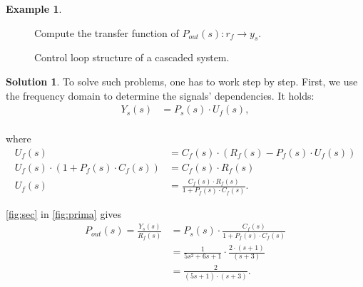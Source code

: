 \documentclass[a4paper,12 pt]{article}
\numberwithin{equation}{section}
\theoremstyle{definition}
\newtheorem{bsp}{Example}
\theoremstyle{remark}
\theoremstyle{definition}
\newtheorem*{lsg}{Solution}
\theoremstyle{definition}
\theoremstyle{definition}
\theoremstyle{remark}
\begin{document}
\begin{bsp}
\begin{figure}[h]
\begin{center}
\caption{Control loop structure of a cascaded system.}
\label{fig:casc3}
\end{center}
Compute the transfer function of $P_{out}(s):r_f\rightarrow y_s$.
\end{figure}



\newpage
\begin{lsg}
To solve such problems, one has to work step by step. First, we use the frequency domain to determine the signals' dependencies. It holds:
\begin{equation}
\begin{split}
Y_s(s)&=P_s(s)\cdot U_f(s),\\
\end{split}
\label{fig:prima}
\end{equation}

where
\begin{equation}
\begin{split}
U_f(s)&=C_f(s)\cdot \left( R_f(s)-P_f(s)\cdot U_f(s)\right)\\
U_f(s)\cdot \left( 1+P_f(s)\cdot C_f(s)\right)&=C_f(s)\cdot R_f(s)\\
U_f(s)&=\frac{C_f(s)\cdot R_f(s)}{1+P_f(s)\cdot C_f(s)}.
\end{split}
\label{fig:sec}
\end{equation}

\ref{fig:sec} in \ref{fig:prima} gives
\begin{equation}
\begin{split}
P_{out}(s)=\frac{Y_s(s)}{R_f(s)}&=P_s(s)\cdot \frac{C_f(s)}{1+P_f(s)\cdot C_f(s)}\\
&=\frac{1}{5s^2+6s+1} \cdot \frac{2\cdot (s+1)}{(s+3)}\\
&=\frac{2}{(5s+1)\cdot (s+3)}.
\end{split}
\end{equation}







\end{lsg}


\end{bsp}
\end{document}
